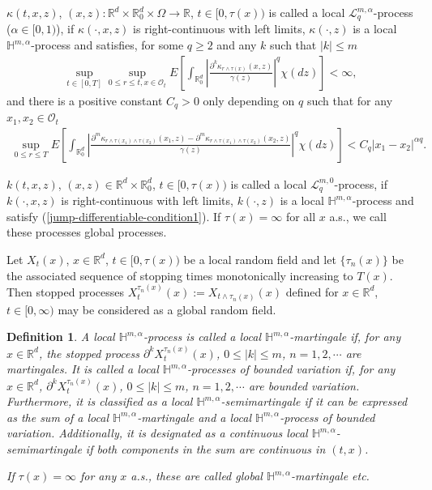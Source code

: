 \documentclass[10pt,a4paper]{amsart}
\newcommand{\be}{\begin{eqnarray}}
\newcommand{\ee}{\end{eqnarray}}
\newtheorem{definition}[theorem]{Definition}
\def\mH{{\mathbb H}}
\def\mR{{\mathbb R}}
\def\sL{{\mathscr L}}
\def\geq{\geqslant}
\def\leq{\leqslant}
\numberwithin{equation}{section}
\begin{document}
$\kappa(t,x,z)$, $(x,z):\mR^d\times \mR^d_0\times \Omega \longrightarrow\mathbb R$, $t\in[0,\tau(x))$ is called a local $\sL_{q}^{m,\alpha}$-process ($\alpha\in [0,1)$), if $\kappa(\cdot,x,z)$  is right-continuous with left limits,   $\kappa(\cdot,z)$ is a  local  $\mH^{m,\alpha}$-process  and satisfies,  for some $q\geq 2$ and any $k$ such that $|k|\leq m$ 
\be\label{jump-differentiable-condition1} 
\sup_{t\in[0,T]}\sup_{0\leq r\leq t,x\in \mathscr O_t}E\left[\int_{\mR^d_0} \left|\frac{\partial^k \kappa_{r\wedge \tau (x)}(x,z)}{\gamma(z)}\right|^q \chi(dz)\right] <\infty,
\ee 
and there is a positive constant $C_q>0$ only depending on $q$ such that for any $x_1,x_2\in \mathscr O_t$
\be \label{jump-differentiable-Holder-condition2} 
\sup_{0\leq r\leq T}E\left[\int_{\mR^d_0} \left|\frac{\partial^m \kappa_{r\wedge \tau(x_1)\wedge\tau(x_2)}(x_1,z)-\partial^m \kappa_{r\wedge \tau(x_1)\wedge\tau(x_2)}(x_2,z)}{\gamma(z)}\right|^q \chi(dz)\right]<C_q |x_1-x_2|^{\alpha q}.
\ee 
 
 $k(t,x,z)$, $(x,z)\in\mR^d\times \mR^d_0$, $t\in[0,\tau(x))$ is called a local $\sL_{q}^{m,0}$-process, if $k(\cdot,x,z)$  is right-continuous with left limits,   $k(\cdot,z)$ is a  local  $\mH^{m,\alpha}$-process and  satisfy (\ref{jump-differentiable-condition1}). If $\tau(x)=\infty$ for all $x$ a.s., we call these processes  global processes.
 
 
 

Let $X_t(x)$, $x\in\mR^d$, $t\in[0,\tau(x))$ be a local random field and let $\{\tau_n(x)\}$ be the associated sequence of stopping times monotonically increasing to $T(x)$. Then stopped processes $X_t^{\tau_n(x)}(x):=X_{t\wedge \tau_n(x)}(x)$ defined for $x\in\mR^d$, $t\in[0,\infty)$ may be considered as a global random field. 

\begin{definition}
	A local $\mH^{m,\alpha}$-process is called a local $\mH^{m,\alpha}$-martingale if, for any $x\in\mR^d$,  the stopped process $\partial^kX_t^{\tau_n(x)}(x)$, $0\leq |k|\leq m$, $n=1,2,\cdots$ are  martingales. It is called a local $\mH^{m,\alpha}$-processes of bounded variation if, for any $x\in\mR^d$,  $\partial^kX_t^{\tau_n(x)}(x)$, $0\leq |k|\leq m$, $n=1,2,\cdots$ are bounded variation. Furthermore, it is classified as a  local  $\mH^{m,\alpha}$-semimartingale if it can be expressed as the sum of a  local  $\mH^{m,\alpha}$-martingale and a  local  $\mH^{m,\alpha}$-process of bounded variation. 	Additionally, it is designated as a continuous local  $\mH^{m,\alpha}$-semimartingale 
	if both components in the sum are continuous in $(t,x)$.
	
	If $\tau(x)=\infty$ for any $x$ a.s., these are called global $\mH^{m,\alpha}$-martingale etc.   
	\end{definition}
\end{document}

